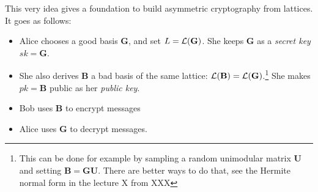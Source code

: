 \documentclass[12pt]{article}
\renewcommand{\vec}{\mathbf}
\begin{document}
This very idea gives a foundation to build asymmetric cryptography from lattices. It goes as follows:
\begin{itemize}
  \item Alice chooses a good basis $\vec G$, and set $L = \cL(\vec G)$. She keeps $\vec G$ as a {\em secret key} $sk = \vec G$.
  \item She also derives $\vec B$ a bad basis of the same lattice: $\cL(\vec B) = \cL(\vec G)$.\footnote{ This can be done for example by sampling a random unimodular matrix $\vec U$ and setting $\vec B = \vec G \vec U$. There are better ways to do that, see the Hermite normal form in the lecture X from XXX} She makes $pk = \vec B$ public as her {\em public key}.
  \item Bob uses $\vec B$ to encrypt messages
  \item Alice uses $\vec G$ to decrypt messages.
\end{itemize}
\end{document}
